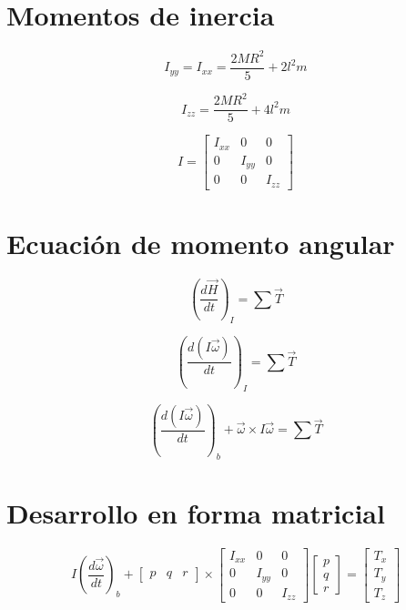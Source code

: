 \documentclass[11pt,a4paper]{article}
\begin{document}
\section{Momentos de inercia}

\begin{equation*}
I_{yy} = I_{xx} = \dfrac{2MR^2}{5} + 2l^2 m
\end{equation*}

\begin{equation*}
I_{zz} = \dfrac{2MR^2}{5} + 4l^2 m
\end{equation*}

\begin{equation*}
I = 
\begin{bmatrix}
I_{xx} & 0 & 0 \\
0 & I_{yy} & 0 \\
0 & 0 & I_{zz}
\end{bmatrix}
\end{equation*}

\section{Ecuación de momento angular}

\begin{equation*}
\left(\dfrac{d\vec H}{dt}\right)_I = \sum \vec{T}
\end{equation*}

\begin{equation*}
\left(\dfrac{d(I\vec\omega)}{dt}\right)_I = \sum \vec{T}
\end{equation*}

\begin{equation*}
\left(\dfrac{d(I\vec\omega)}{dt}\right)_b + \vec\omega \times I\vec\omega = \sum \vec{T}
\end{equation*}

\section{Desarrollo en forma matricial}

\begin{equation*}
I\left(\dfrac{d\vec\omega}{dt}\right)_b + 
\begin{bmatrix} p & q & r \end{bmatrix} \times
\begin{bmatrix}
I_{xx} & 0 & 0 \\
0 & I_{yy} & 0 \\
0 & 0 & I_{zz}
\end{bmatrix}
\begin{bmatrix} p \\ q \\ r \end{bmatrix}
=
\begin{bmatrix} T_x \\ T_y \\ T_z \end{bmatrix}
\end{equation*}
\end{document}
